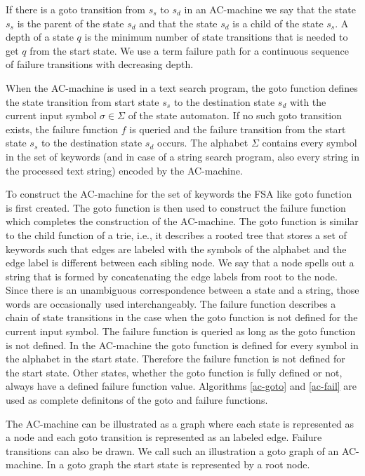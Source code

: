 \documentclass[english,twoside,censored,csm,algorithms-track-2020]{HYthesisML}
\theoremstyle{plain}
\theoremstyle{definition}
\begin{document}
If there is a goto transition from $s_s$ to $s_d$ in an AC-machine we say that the state $s_s$ is the parent
of the state $s_d$ and that the state $s_d$ is a child of the state $s_s$. A depth of a state $q$ is the
minimum number of state transitions that is needed to get $q$ from the start state. 
We use a term failure path for a continuous sequence of failure transitions with decreasing depth.

When the AC-machine is used in a text search program,
the goto function defines the state transition from start state $s_s$ to the destination state
$s_d$ with the current input symbol $\sigma\in \Sigma$ of the state automaton. If no such
goto transition exists,
the failure function $f$ is queried and the failure transition from the start state $s_s$ to
the destination state $s_d$ occurs. The alphabet $\Sigma$ contains every symbol in the set of
keywords (and in case of a string search program, also every string in the processed text string)
encoded by the AC-machine.

To construct the AC-machine for the set of keywords the \textsc{FSA} like goto function is first
created. The goto function is then used to construct the failure function which completes the
construction of the AC-machine. The goto function is similar to the child function of a trie,
i.e., it describes a rooted tree that stores a set of keywords such that edges are labeled with the
symbols of the alphabet and the edge label is different between each sibling node. We say that a node
spells out a string that is formed by concatenating the edge labels from root to the node.
Since there is an unambiguous correspondence between a state and a string, those words are occasionally
used interchangeably.
The failure function describes a chain of state transitions in the case when the goto function is not defined
for the current input symbol. The failure function is queried as long as the goto function is not defined.
In the AC-machine the goto function is defined for every symbol in the alphabet in the start state.
Therefore the failure function is not defined for the start state. Other states, whether the
goto function is fully defined or not, always have a defined failure function value.
Algorithms \ref{ac-goto} and \ref{ac-fail} are used as complete definitons of the goto and
failure functions. 

The AC-machine can be illustrated as a graph where each state is represented as a node and each
goto transition is represented as an labeled edge. Failure transitions can also be drawn. We call
such an illustration a goto graph of an AC-machine. In a goto graph the start state is represented by
a root node.
\end{document}
